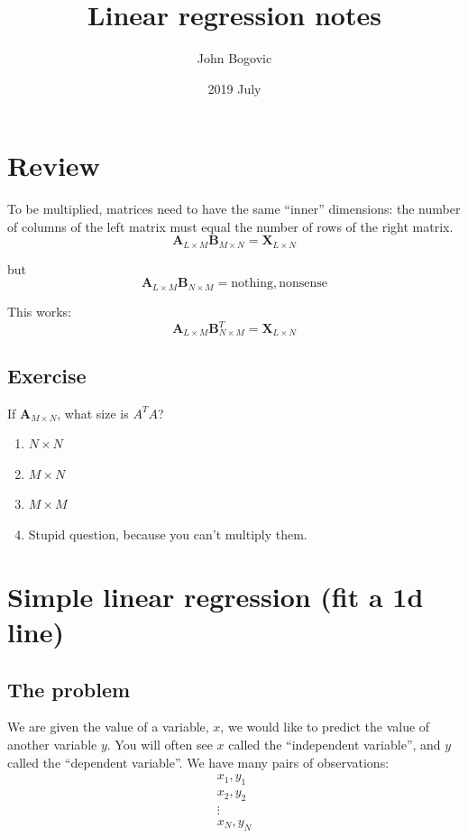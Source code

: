 \documentclass[11pt]{article}
\title{Linear regression notes}
\author{John Bogovic}
\date{2019 July}
\newcommand\amtx{\boldsymbol{A}}
\newcommand\bmtx{\boldsymbol{B}}
\newcommand\xmtx{\boldsymbol{X}}
\begin{document}
\maketitle

\section{ Review }

To be multiplied, matrices need to have the same ``inner'' dimensions:
the number of columns of the left matrix must equal the number of rows
of the right matrix.
\begin{equation}
    \amtx_{L \times M } \bmtx_{M \times N} = \xmtx_{L \times N }
\end{equation}

but 
\begin{equation}
    \amtx_{L \times M } \bmtx_{N \times M} = \mathrm{ nothing, nonsense }
\end{equation}

This works:
\begin{equation}
    \amtx_{L \times M } \bmtx_{N \times M}^T =  \xmtx_{L \times N }
\end{equation}

\subsection{ Exercise }

If $\amtx_{M \times N}$, what size is $A^T A$?
\begin{enumerate}
    \item $N \times N$
    \item $M \times N$
    \item $M \times M$
    \item Stupid question, because you can't multiply them.
\end{enumerate}





\section{ Simple linear regression (fit a 1d line)}

\subsection{The problem}

We are given the value of a variable, $x$, we would like to predict
the value of another variable $y$.  You will often see $x$ called the
``independent variable'', and $y$ called the ``dependent variable''.
We have many pairs of observations:
\begin{equation}
    \begin{array}{l}
    x_1, y_1 \\
    x_2, y_2 \\
    \vdots \\
    x_N, y_N \\
    \end{array}
\end{equation}
\end{document}
